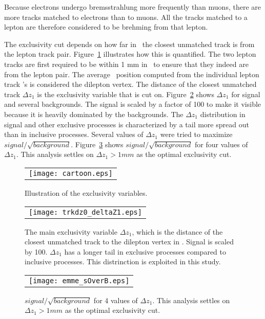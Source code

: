 \par Because electrons undergo bremsstrahlung more frequently than muons, there are more tracks 
matched to electrons than to muons. All the tracks matched to a lepton are therefore 
considered to be brehming from that lepton.

\par The exclusivity cut depends on how far in \ the closest unmatched track 
is from the lepton track pair. Figure~\ref{fig:cartoon} illustrates how this is quantified. 
The two lepton tracks are first required to be within 1 mm in \ to ensure that they indeed 
are from the lepton pair. The average \ position computed from the individual lepton track 's is 
considered the dilepton vertex. The distance of the closest unmatched track $\Delta z_1$ is the 
exclusivity variable that is cut on. Figure~\ref{fig:deltaZ1} shows $\Delta z_1$  for signal and several backgrounds.
The signal is scaled by a factor of 100 to make it visible because it is heavily dominated by the backgrounds.
The $\Delta z_1$ distribution in signal and other exclusive processes 
is characterized by a tail more spread out than in inclusive processes. Several values of $\Delta z_1$ 
were tried to maximize $signal/\sqrt{background}$. Figure~\ref{fig:sOverB} shows $signal/\sqrt{background}$
for four values of $\Delta z_1$. This analysis settles on $\Delta z_1 > 1 mm$ as the optimal 
exclusivity cut.    

\begin{figure}[!h]
\centering
\begin{tabular}{c}
\texttt{[image: cartoon.eps]}
\end{tabular}
\caption{Illustration of the exclusivity variables.}
\label{fig:cartoon}
\end{figure}

\begin{figure}[!h]
\centering
\begin{tabular}{c}
	\texttt{[image: trkdz0\_deltaZ1.eps]}
\end{tabular}
\caption{The main exclusivity variable $\Delta z_1$, which is the distance of 
the closest unmatched track to the dilepton vertex in . Signal is scaled by 100. 
$\Delta z_1$ has a longer tail in exclusive processes compared to inclusive processes. 
This distrinction is exploited in this study.}
\label{fig:deltaZ1}
\end{figure}

\begin{figure}[!h]
\centering
\begin{tabular}{c}
\texttt{[image: emme\_sOverB.eps]}
\end{tabular}
\caption{$signal/\sqrt{background}$ for 4 values of $\Delta z_1$. This analysis settles 
on $\Delta z_1 > 1 mm$ as the optimal exclusivity cut.}
\label{fig:sOverB}
\end{figure}

